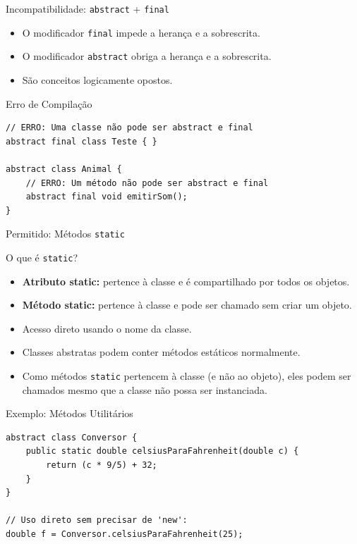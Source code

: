 \documentclass[9pt]{beamer}
\begin{document}
\begin{frame}[fragile]{Incompatibilidade: \texttt{abstract} + \texttt{final}}
\begin{itemize}
    \item O modificador \texttt{final} impede a herança e a sobrescrita.
    \item O modificador \texttt{abstract} obriga a herança e a sobrescrita.
    \item São conceitos logicamente opostos.
\end{itemize}

\begin{alertblock}{Erro de Compilação}
\begin{verbatim}
// ERRO: Uma classe não pode ser abstract e final
abstract final class Teste { } 

abstract class Animal {
    // ERRO: Um método não pode ser abstract e final
    abstract final void emitirSom(); 
}
\end{verbatim}
\end{alertblock}
\end{frame}

\begin{frame}[fragile]{Permitido: Métodos \texttt{static}}

\begin{block}{O que é \texttt{static}?}
\begin{itemize}
    \item \textbf{Atributo static:} pertence à classe e é compartilhado por todos os objetos.
    \item \textbf{Método static:} pertence à classe e pode ser chamado sem criar um objeto.
    \item Acesso direto usando o nome da classe.
\end{itemize}
\end{block}
\begin{itemize}
    \item Classes abstratas podem conter métodos estáticos normalmente.
    \item Como métodos \texttt{static} pertencem à classe (e não ao objeto), eles podem ser chamados mesmo que a classe não possa ser instanciada.
\end{itemize}

\begin{block}{Exemplo: Métodos Utilitários}
\begin{verbatim}
abstract class Conversor {
    public static double celsiusParaFahrenheit(double c) {
        return (c * 9/5) + 32;
    }
}

// Uso direto sem precisar de 'new':
double f = Conversor.celsiusParaFahrenheit(25);
\end{verbatim}
\end{block}
\end{frame}
\end{document}

